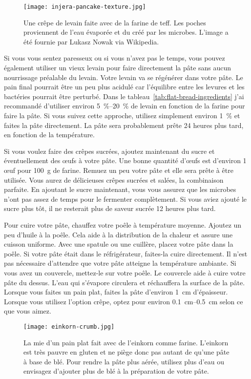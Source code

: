 \begin{figure}[htb!]
\begin{center}
  \texttt{[image: injera-pancake-texture.jpg]}
  \caption[Crêpe de levain de teff]{Une crêpe de levain faite avec de la farine de teff.
      Les poches proviennent de l'eau évaporée et du  créé par les
      microbes.  L'image a été fournie par Lukasz Nowak via Wikipedia.}
\end{center}
\end{figure}

Si vous vous sentez paresseux ou si vous n'avez pas le temps, vous pouvez également utiliser un vieux levain pour faire directement la pâte sans aucun nourrissage préalable du levain. Votre levain va se régénérer dans votre pâte. Le pain final pourrait être un peu plus acidulé car l'équilibre entre les levures et les bactéries pourrait être perturbé. Dans le tableau~\ref{tab:flat-bread-ingredients}
j'ai recommandé d'utiliser environ \qtyrange{5}{20}{\percent}
de levain en fonction de la farine pour faire la pâte. Si vous suivez
cette approche, utilisez simplement environ \qty{1}{\percent} et faites la pâte directement.
La pâte sera probablement prête 24 heures plus tard, en fonction de la température.

Si vous voulez faire des crêpes sucrées, ajoutez maintenant du sucre et éventuellement des œufs à votre pâte. Une bonne quantité d'œufs est d'environ 1 œuf pour \qty{100}{\gram} de farine.
Remuez un peu votre pâte et elle sera prête à être utilisée. Vous aurez
de délicieuses crêpes sucrées et salées, la combinaison parfaite. En
ajoutant le sucre maintenant, vous vous assurez que les microbes n'ont pas
assez de temps pour le fermenter complètement. Si vous aviez ajouté le sucre
plus tôt, il ne resterait plus de saveur sucrée 12 heures plus tard.

Pour cuire votre pâte, chauffez votre poêle à température moyenne. Ajoutez un peu d'huile à la poêle. Cela aide à la distribution de la chaleur et assure une cuisson uniforme.
Avec une spatule ou une cuillère, placez votre pâte dans la poêle. Si votre pâte
était dans le réfrigérateur, faites-la cuire directement. Il n'est pas nécessaire d'attendre que votre
pâte atteigne la température ambiante. Si vous avez un couvercle,
mettez-le sur votre poêle. Le couvercle aide à cuire votre pâte du dessus.
L'eau qui s'évapore circulera et réchauffera la surface de la pâte. Lorsque
vous faites un pain plat, faites la pâte d'environ \qty{1}{\cm} d'épaisseur. Lorsque vous utilisez l'option
crêpe, optez pour environ \qtyrange{0.1}{0.5}{\cm} selon ce que vous
aimez.\begin{figure}[htb!]
\begin{center}
  \texttt{[image: einkorn-crumb.jpg]}
  \caption[Einkorn crumb]{La mie d'un pain plat fait avec de l'einkorn comme farine.
      L'einkorn est très pauvre en gluten et ne piège donc pas autant de  qu'une
      pâte à base de blé. Pour rendre la pâte plus aérée, utilisez plus d'eau ou
      envisagez d'ajouter plus de blé à la préparation de votre pâte.}
\end{center}
\end{figure}


